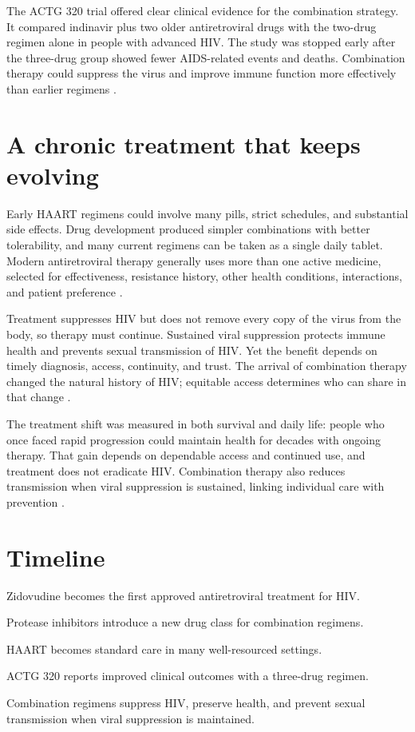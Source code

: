 \documentclass[12pt,oneside]{book}
\begin{document}
The ACTG 320 trial offered clear clinical evidence for the combination
strategy. It compared indinavir plus two older antiretroviral drugs with
the two-drug regimen alone in people with advanced HIV. The study was
stopped early after the three-drug group showed fewer AIDS-related events
and deaths. Combination therapy could suppress the virus and improve
immune function more effectively than earlier regimens
\cite{actg320Trial}.

\section{A chronic treatment that keeps evolving}
Early HAART regimens could involve many pills, strict schedules, and
substantial side effects. Drug development produced simpler combinations
with better tolerability, and many current regimens can be taken as a
single daily tablet. Modern antiretroviral therapy generally uses more
than one active medicine, selected for effectiveness, resistance history,
other health conditions, interactions, and patient preference
\cite{nihHIVTreatmentBasics}.

Treatment suppresses HIV but does not remove every copy of the virus from
the body, so therapy must continue. Sustained viral suppression protects
immune health and prevents sexual transmission of HIV. Yet the benefit
depends on timely diagnosis, access, continuity, and trust. The arrival of
combination therapy changed the natural history of HIV; equitable access
determines who can share in that change \cite{nihHIVTreatmentBasics}.

The treatment shift was measured in both survival and daily life: people who
once faced rapid progression could maintain health for decades with ongoing
therapy. That gain depends on dependable access and continued use, and
treatment does not eradicate HIV. Combination therapy also reduces
transmission when viral suppression is sustained, linking individual care with
prevention \cite{actg320Trial,nihHIVTreatmentBasics}.

\section*{Timeline}
\begin{description}[leftmargin=2.3cm,style=nextline]
  \item[1987] Zidovudine becomes the first approved antiretroviral treatment for HIV.
  \item[1995--1996] Protease inhibitors introduce a new drug class for combination regimens.
  \item[1996--1997] HAART becomes standard care in many well-resourced settings.
  \item[1997] ACTG 320 reports improved clinical outcomes with a three-drug regimen.
  \item[Today] Combination regimens suppress HIV, preserve health, and prevent sexual transmission when viral suppression is maintained.
\end{description}
\end{document}
